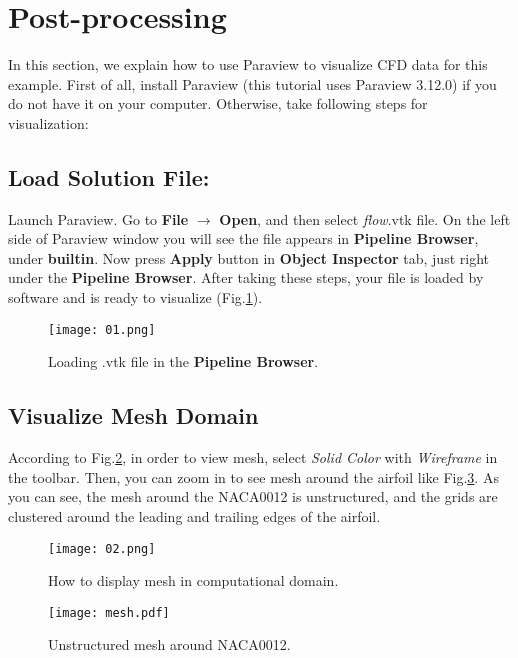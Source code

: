 \section{Post-processing}
In this section, we explain how to use Paraview to visualize CFD data for this example. First of all, install Paraview (this tutorial uses Paraview 3.12.0) if you do not have it on your computer. Otherwise, take following steps for visualization:
\subsection{Load Solution File:}
Launch Paraview. Go to \textbf{File} $\rightarrow$ \textbf{Open}, and then select \textit{flow}.vtk file. On the left side of Paraview window you will see the file appears in \textbf{Pipeline Browser}, under \textbf{builtin}. Now press \textbf{Apply} button in \textbf{Object Inspector} tab, just right under the  \textbf{Pipeline Browser}. After taking these steps, your file is loaded by software and is ready to visualize (Fig.\ref{fig:load}).
\begin{figure}[htbp]
    \centering
    \texttt{[image: 01.png]}
    \caption{Loading .vtk file in the \textbf{Pipeline Browser}.}
    \label{fig:load}
\end{figure}
\subsection{Visualize Mesh Domain}
According to Fig.\ref{fig:wireframe}, in order to view mesh, select \textit{Solid Color} with \textit{Wireframe} in the toolbar. Then, you can zoom in to see mesh around the airfoil like Fig.\ref{fig:mesh}. As you can see, the mesh around the NACA0012 is unstructured, and the grids are clustered around the leading and trailing edges of the airfoil.
\begin{figure}[htbp]
    \centering
    \texttt{[image: 02.png]}
    \caption{How to display mesh in computational domain.}
    \label{fig:wireframe}
\end{figure}
\begin{figure}[htbp]
    \centering
    \texttt{[image: mesh.pdf]}
    \caption{Unstructured mesh around NACA0012.}
    \label{fig:mesh}
\end{figure}
